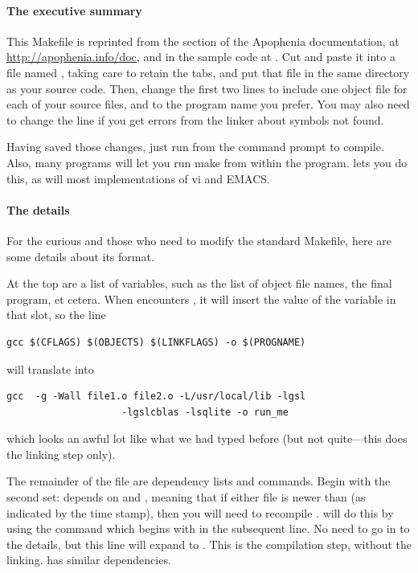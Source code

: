 \documentclass[12pt]{article}
\def\ind#1{\index{#1}#1}
\begin{document}
\paragraph{The executive summary} This Makefile is reprinted from the 
section of the Apophenia documentation, at
\url{http://apophenia.info/doc}, and in the sample code at 
\samplecodelocation. Cut and paste it into a file named
, taking care to retain the tabs, and put that file in
the same directory as your source code. Then, change the first two lines
to include one object file for each of your source files, and
to the program name you prefer.  You may also need to change the
 line if you get errors from the linker about symbols
not found.

Having saved those changes, just run
 from the command prompt to compile.
Also, many programs will let you run
make from within the program.  lets you do this,
as will most implementations of \ind{vi} and \ind{EMACS}.


\paragraph{The details} For the curious and those who need to modify
the standard Makefile, here are some details about its format.

At the top are a list of variables, such as the list of object file names, the final program, et cetera.
When  encounters , it will insert the value of the variable  in that
slot, so the line 
\begin{lstlisting}
gcc $(CFLAGS) $(OBJECTS) $(LINKFLAGS) -o $(PROGNAME)
\end{lstlisting}
will translate into
\begin{lstlisting}
gcc  -g -Wall file1.o file2.o -L/usr/local/lib -lgsl 
                    -lgslcblas -lsqlite -o run_me
\end{lstlisting}
which looks an awful lot like what we had typed before (but not quite---this does the linking step only).

The remainder of the file are dependency lists and commands. Begin
with the second set:  depends on  and , meaning that if either file is newer than 
(as indicated by the time stamp), then you will need to recompile .  will do this by using the command which begins with
 in the subsequent line. No need to go in to the details, but
this line will expand to . This
is the compilation step, without the linking.  has similar
dependencies.
\end{document}
